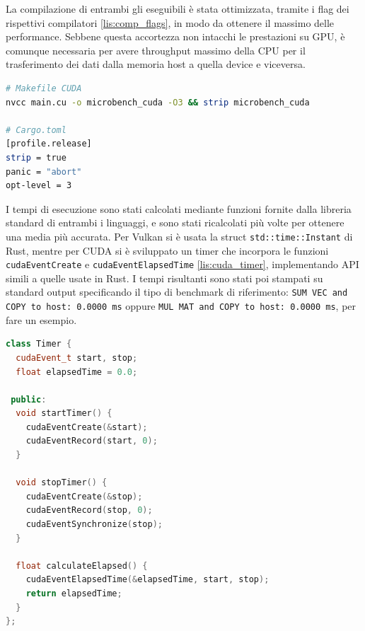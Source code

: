 La compilazione di entrambi gli eseguibili è stata ottimizzata, tramite i flag dei rispettivi compilatori \ref{lis:comp_flags}, in modo da ottenere il massimo delle performance. Sebbene questa accortezza non intacchi le prestazioni su GPU, è comunque necessaria per avere throughput massimo della CPU per il trasferimento dei dati dalla memoria host a quella device e viceversa.

\vspace{5mm}
\begin{lstlisting}[language=bash, caption=Impostazioni di compilazione CUDA e Rust, label=lis:comp_flags]
# Makefile CUDA
nvcc main.cu -o microbench_cuda -O3 && strip microbench_cuda

# Cargo.toml
[profile.release]
strip = true
panic = "abort"
opt-level = 3
\end{lstlisting}
\vspace{5mm}

I tempi di esecuzione sono stati calcolati mediante funzioni fornite dalla libreria standard di entrambi i linguaggi, e sono stati ricalcolati più volte per ottenere una media più accurata. Per Vulkan si è usata la struct \verb|std::time::Instant| di Rust, mentre per CUDA si è sviluppato un timer che incorpora le funzioni \verb|cudaEventCreate| e \verb|cudaEventElapsedTime| \ref{lis:cuda_timer}, implementando API simili a quelle usate in Rust. I tempi risultanti sono stati poi stampati su standard output specificando il tipo di benchmark di riferimento: \verb|SUM VEC and COPY to host: 0.0000 ms| oppure \verb|MUL MAT and COPY to host: 0.0000 ms|, per fare un esempio. 

\vspace{5mm}
\begin{lstlisting}[language=C++, caption=Timer CUDA, label=lis:cuda_timer]
class Timer {
  cudaEvent_t start, stop;
  float elapsedTime = 0.0;

 public:
  void startTimer() {
    cudaEventCreate(&start);
    cudaEventRecord(start, 0);
  }

  void stopTimer() {
    cudaEventCreate(&stop);
    cudaEventRecord(stop, 0);
    cudaEventSynchronize(stop);
  }

  float calculateElapsed() {
    cudaEventElapsedTime(&elapsedTime, start, stop);
    return elapsedTime;
  }
};
\end{lstlisting}
\vspace{5mm}


